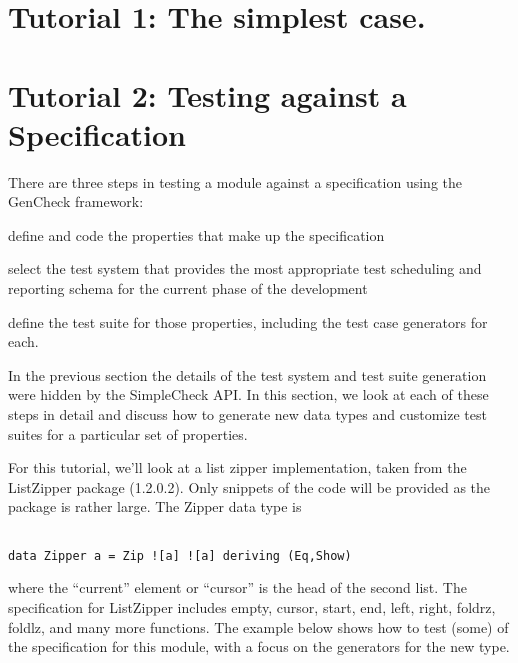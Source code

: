 \section{Tutorial 1: The simplest case.}



\section{Tutorial 2: Testing against a Specification}

There are three steps in testing a module against 
a specification using the GenCheck framework:

\begin{enumeration}
\item define and code the properties that make up the specification
\item select the test system that provides the most appropriate
test scheduling and reporting schema for the current phase of the development
\item define the test suite for those properties,
including the test case generators for each.
\end{enumeration}

In the previous section the details of the test system
and test suite generation were hidden by the SimpleCheck API.
In this section, we look at each of these steps in detail 
and discuss how to generate new data types and customize test suites
for a particular set of properties.

For this tutorial, we'll look at a list zipper implementation,
taken from the ListZipper package (1.2.0.2).  Only snippets
of the code will be provided as the package is rather large.
The Zipper data type is

\begin{verbatim}

data Zipper a = Zip ![a] ![a] deriving (Eq,Show)

\end{verbatim}

where the ``current'' element or ``cursor'' is the head of the second list.
The specification for ListZipper includes empty, cursor, start, end, left, right, foldrz, foldlz, 
and many more functions.  The example below shows how to test (some)
of the specification for this module, with a focus on the generators for the new type.

